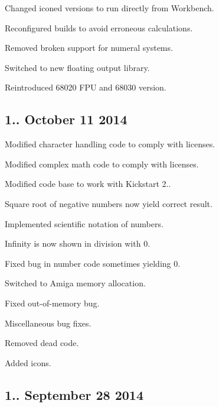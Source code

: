 \begin{DoxyItemize}
\item Changed iconed versions to run directly from Workbench.
\item Reconfigured builds to avoid erroneous calculations.
\item Removed broken support for numeral systems.
\item Switched to new floating output library.
\item Reintroduced 68020 F\+PU and 68030 version.
\end{DoxyItemize}\hypertarget{release_page_version152}{}\subsection{1.. October 11 2014}\label{release_page_version152}

\begin{DoxyItemize}
\item Modified character handling code to comply with licenses.
\item Modified complex math code to comply with licenses.
\item Modified code base to work with Kickstart 2..
\item Square root of negative numbers now yield correct result.
\item Implemented scientific notation of numbers.
\item Infinity is now shown in division with 0.
\item Fixed bug in number code sometimes yielding 0.
\item Switched to Amiga memory allocation.
\item Fixed out-\/of-\/memory bug.
\item Miscellaneous bug fixes.
\item Removed dead code.
\item Added icons.
\end{DoxyItemize}\hypertarget{release_page_version151}{}\subsection{1.. September 28 2014}\label{release_page_version151}

